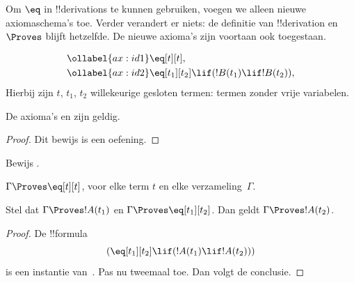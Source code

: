 \documentclass[../../../include/open-logic-section]{subfiles}
\begin{document}


Om $\eq$ in !!{derivation}s te kunnen gebruiken, voegen we alleen
nieuwe axiomaschema's toe. Verder verandert er niets: de definitie van
!!{derivation} en $\Proves$ blijft hetzelfde. De nieuwe axioma's zijn
voortaan ook toegestaan.

\begin{defn}
\begin{align}
\ollabel{ax:id1} & \eq[t][t], \\
\ollabel{ax:id2} & \eq[t_1][t_2] \lif (!B(t_1) \lif
  !B(t_2)),
\end{align}
Hierbij zijn $t$, $t_1$, $t_2$ willekeurige gesloten termen: termen
zonder vrije variabelen.
\end{defn}

\begin{prop}
  De axioma's  en  zijn geldig.
\end{prop}

\begin{proof}
  Dit bewijs is een oefening.
\end{proof}

\begin{prob}
Bewijs .
\end{prob}

\begin{prop}
 $\Gamma \Proves \eq[t][t]$, voor elke term $t$ en elke
 verzameling~$\Gamma$.
\end{prop}

\begin{prop}
  Stel dat $\Gamma \Proves !A(t_1)$ en $\Gamma \Proves
  \eq[t_1][t_2]$. Dan geldt $\Gamma \Proves !A(t_2)$.
\end{prop}

\begin{proof}
De !!{formula}
\[
(\eq[t_1][t_2] \lif (!A(t_1) \lif !A(t_2)))
\]
is een instantie van~. Pas nu \MP{} tweemaal toe. Dan
volgt de conclusie.
\end{proof}
\end{document}
